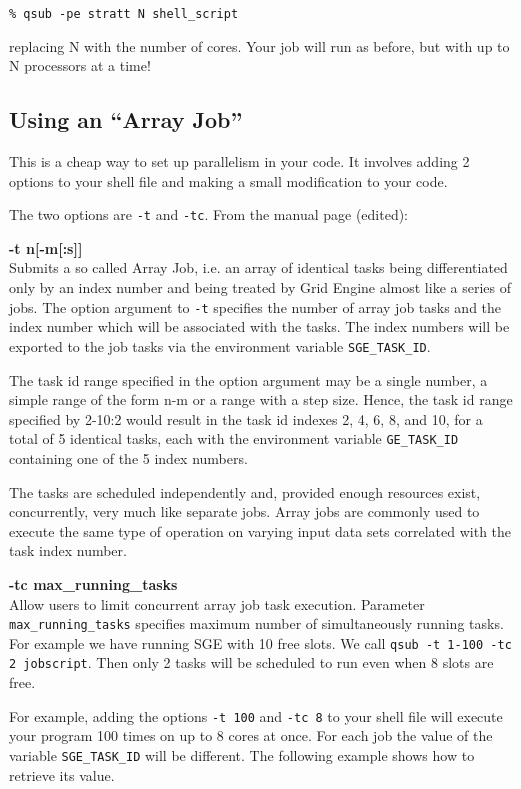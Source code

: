 \documentclass[letterpaper,12pt]{article}
\begin{document}
\begin{verbatim}
% qsub -pe stratt N shell_script
\end{verbatim}
replacing N with the number of cores. Your job will run as before, but with up to N processors at a time!

\subsection{Using an ``Array Job''}
This is a cheap way to set up parallelism in your code. It involves adding 2 options to your shell file and making a small modification to your code.

The two options are \texttt{-t} and \texttt{-tc}. From the manual page (edited):
\begin{framed}
\textbf{-t n[-m[:s]]}\\
Submits  a  so  called  Array Job, i.e. an array of identical tasks being differentiated only by an index number and being treated by Grid Engine almost like a series of jobs. The option argument to \texttt{-t} specifies the number of array job tasks and the index number which will be associated with the tasks. The index numbers will be exported to the job tasks via the environment  variable  \texttt{SGE\_TASK\_ID}.

The  task  id range specified in the option argument may be a single number, a simple range of the form n-m or a range with a step size. Hence, the task id range specified by 2-10:2 would result in the task id indexes 2, 4, 6, 8, and 10, for a total of 5 identical tasks, each with the environment variable \texttt{GE\_TASK\_ID} containing one of the 5 index numbers.

The tasks are  scheduled  independently  and, provided  enough  resources  exist, concurrently, very much like separate jobs. Array jobs are commonly used to execute the same type of operation on varying input data sets correlated with the task index number. 

\textbf{-tc max\_running\_tasks}\\
Allow  users to limit concurrent array job task execution. Parameter \texttt{max\_running\_tasks} specifies maximum number of simultaneously running tasks.  For example we have running SGE with 10 free slots. We call \texttt{qsub -t 1-100 -tc 2 jobscript}. Then only 2 tasks will be scheduled to run even when 8 slots are free.
\end{framed}

For example, adding the options \texttt{-t 100} and \texttt{-tc 8} to your shell file will execute your program 100 times on up to 8 cores at once. For each job the value of the variable \texttt{SGE\_TASK\_ID} will be different. The following example shows how to retrieve its value.
\end{document}
